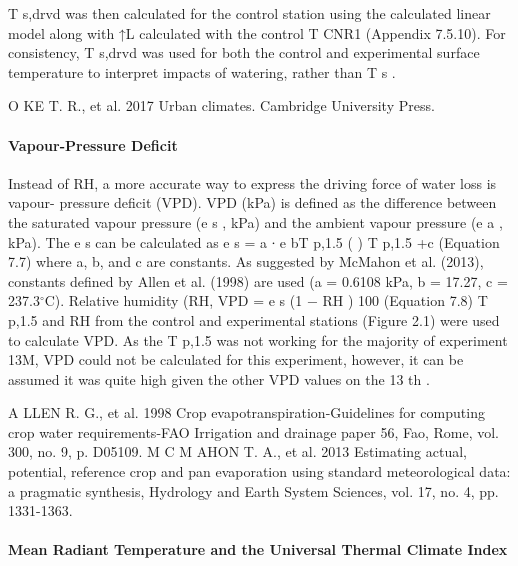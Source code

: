 \documentclass[final,3p,times,authoryear]{elsarticle}
\begin{document}
T s,drvd was then calculated for the control station using the calculated linear model along
with ↑L calculated with the control T CNR1 (Appendix 7.5.10). For consistency, T s,drvd was
used for both the control and experimental surface temperature to interpret impacts of
watering, rather than T s .

O KE T. R., et al. 2017 Urban climates. Cambridge University Press.


\paragraph{Vapour-Pressure Deficit}\label{sec:appendix7.4.3}

Instead of RH, a more accurate way to express the driving force of water loss is vapour-
pressure deficit (VPD). VPD (kPa) is defined as the difference between the saturated
vapour pressure (e s , kPa) and the ambient vapour pressure (e a , kPa).
The e s can be calculated as
e s = a ∙ e
bT p,1.5
(
)
T p,1.5 +c
(Equation 7.7)
where a, b, and c are constants. As suggested by McMahon et al. (2013), constants
defined by Allen et al. (1998) are used (a = 0.6108 kPa, b = 17.27, c = 237.3$^{\circ}$C).
Relative humidity (RH, %
VPD = e s (1 −
RH
)
100
(Equation 7.8)
T p,1.5 and RH from the control and experimental stations (Figure 2.1) were used to
calculate VPD. As the T p,1.5 was not working for the majority of experiment 13M, VPD
could not be calculated for this experiment, however, it can be assumed it was quite
high given the other VPD values on the 13 th .

A LLEN R. G., et al. 1998 Crop evapotranspiration-Guidelines for computing crop water
requirements-FAO Irrigation and drainage paper 56, Fao, Rome, vol. 300, no. 9, p.
D05109.
M C M AHON T. A., et al. 2013 Estimating actual, potential, reference crop and pan evaporation
using standard meteorological data: a pragmatic synthesis, Hydrology and Earth System
Sciences, vol. 17, no. 4, pp. 1331-1363.

\paragraph{Mean Radiant Temperature and the Universal Thermal Climate Index}\label{sec:appendix7.4.4}
\end{document}
